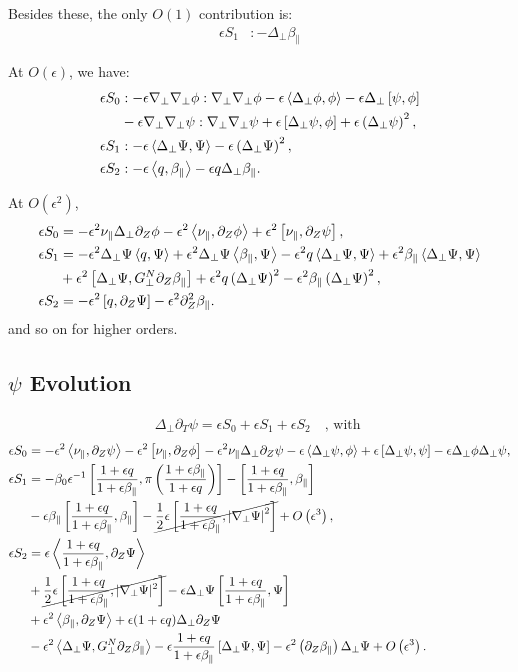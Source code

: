 \documentclass{article}
\newcommand{\para}{\parallel}
\newcommand{\ep}{\epsilon}
\newcommand{\np}{\nabla_\perp}
\newcommand{\lap}{\Delta_\perp}
\newcommand{\p}{\partial}
\newcommand{\fr}{\frac{1+\ep q}{1+\ep\beta_\para}}
\newcommand{\frinv}{\frac{1+\ep\beta_\para}{1+\ep q}}
\newcommand{\GN}{G_\perp^N}
\newcommand{\pth} [1] {\left( #1 \right) }
\newcommand{\br} [1] {\left[ #1 \right] }
\begin{document}
Besides these, the only $O(1)$ contribution is:
\begin{align*}
    \ep S_1 &: -\lap\beta_\para 
\end{align*}

At $O(\ep)$, we have: 
\begin{align*}
    \ep S_0 &: - \ep\np\np\phi:\np\np\phi - \ep\Braket{\lap\phi, \phi} - \ep\lap\br{\psi,\phi} \\ 
        &- \ep\np\np\psi:\np\np\psi + \ep\br{\lap\psi, \phi} + \ep\pth{\lap\psi}^2, \\ 
    \ep S_1 &: - \ep\Braket{\lap\Psi, \Psi} - \ep\pth{\lap\Psi}^2, \\ 
    \ep S_2 &: - \ep\Braket{q,\beta_\para} - \ep q\lap\beta_\para. 
\end{align*}

At $O(\ep^2)$, 
\begin{align*}
    \ep S_0 &= -\ep^2\nu_\para \lap\p_Z\phi - \ep^2\Braket{\nu_\para, \p_Z\phi} + \ep^2\br{\nu_\para, \p_Z\psi}, \\ 
    \ep S_1 &= - \ep^2\lap\Psi \Braket{q,\Psi} + \ep^2\lap\Psi \Braket{\beta_\para,\Psi} - \ep^2q \Braket{\lap\Psi, \Psi} + \ep^2 \beta_\para\Braket{\lap\Psi, \Psi} \\ 
        &+ \ep^2\br{\lap\Psi, \GN\p_Z\beta_\para} + \ep^2q\pth{\lap\Psi}^2 - \ep^2\beta_\para\pth{\lap\Psi}^2, \\ 
    \ep S_2 &= - \ep^2\br{q, \p_Z\Psi} - \ep^2\p^2_Z\beta_\para. 
\end{align*}
and so on for higher orders. 


\subsection{$\psi$ Evolution}
\begin{align} 
    \lap\p_T \psi = \ep S_0 + \ep S_1 + \ep S_2 \quad\text{, with }
\end{align}
\begin{align*}
    \ep S_0 &= -\ep^2\Braket{\nu_\para, \p_Z\psi} -\ep^2\br{\nu_\para, \p_Z\phi} - \ep^2\nu_\para\lap\p_Z\psi - \ep\Braket{\lap\psi, \phi} + \ep\br{\lap\psi, \psi} - \ep\lap\phi\lap\psi, \\ 
    \ep S_1 &= -\beta_0\ep^{-1} \br{\fr, \pi\pth{\frinv}} - \br{\fr, \beta_\para} \\ 
        &- \ep\beta_\para\br{\fr, \beta_\para} - \cancel{\frac{1}{2}\ep \br{\fr, \left|\np\Psi\right|^2}} + O\pth{\ep^3}, \\ 
    \ep S_2 &= \ep\Braket{\fr, \p_Z\Psi} \\ 
        &+ \cancel{\frac{1}{2}\ep\br{\fr, |\np\Psi|^2}} - \ep\lap\Psi\br{\fr, \Psi} \\ 
        &+ \ep^2\Braket{\beta_\para, \p_Z\Psi} + \ep(1+\ep q) \lap\p_Z\Psi \\ 
        &- \ep^2\Braket{\lap\Psi, \GN\p_Z\beta_\para} - \ep\fr\br{\lap\Psi, \Psi} - \ep^2\pth{\p_Z\beta_\para}\lap\Psi + O\pth{\ep^3}. 
\end{align*}
\end{document}
